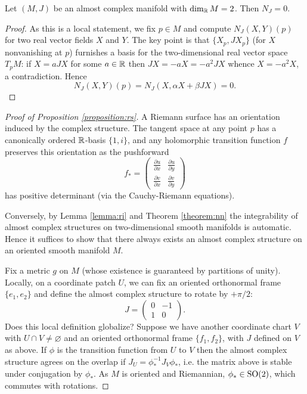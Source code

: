 \documentclass{amsart}
\begin{document}
\begin{lemma}
    Let $(M,J)$ be an almost complex manifold with $\dim_{\mathbb{R}} M=2$. Then $N_J=0$.
    \label{lemma:ri}
\end{lemma}
\begin{proof}
    As this is a local statement, we fix $p\in M$ and compute $N_J(X,Y)(p)$ for two real vector fields
    $X$ and $Y$. The key point is that $\{X_p, JX_p\}$ (for $X$ nonvanishing at $p$) furnishes a basis for
    the two-dimensional real vector space $T_pM$: if $X=aJX$ for some $a\in\mathbb{R}$ then $JX=-aX=-a^2JX$ whence
    $X=-a^2X$, a contradiction. Hence
    \begin{equation*}
        N_J(X,Y)(p) = N_J(X, \alpha X+\beta JX) = 0.
    \end{equation*}
\end{proof}

\begin{proof}[Proof of Proposition \ref{proposition:rs}]
    A Riemann surface has an orientation induced by the complex structure. The
    tangent space at any point $p$ has a canonically ordered $\mathbb{R}$-basis $\{1,i\}$, and any holomorphic transition
    function $f$ preserves this orientation as the pushforward
    \begin{equation*}
        f_* =
        \begin{pmatrix}
            \frac{\partial u}{\partial x} & \frac{\partial u}{\partial y}\\
            \frac{\partial v}{\partial x} & \frac{\partial v}{\partial y}
        \end{pmatrix}
    \end{equation*}
    has positive determinant (via the Cauchy-Riemann equations).


    Conversely, by Lemma \ref{lemma:ri} and Theorem \ref{theorem:nn} the integrability of almost complex structures on
    two-dimensional smooth manifolds is automatic. Hence it suffices to show that there always exists an almost
    complex structure on an oriented smooth manifold $M$.

    Fix a metric $g$ on $M$ (whose existence is guaranteed by partitions of unity). Locally, on a coordinate patch
    $U$, we can fix an oriented orthonormal frame $\{e_1,e_2\}$ and define the almost complex structure to rotate
    by $+\pi/2$:
    \begin{equation*}
        J =
        \begin{pmatrix}
            0 & -1\\ 1 & 0
        \end{pmatrix}.
    \end{equation*}
    Does this local definition globalize? Suppose we have another coordinate chart $V$ with $U\cap V\neq\varnothing$
    and an oriented orthonormal frame $\{f_1,f_2\}$, with $J$ defined on $V$ as above. If $\phi$ is the transition function
    from $U$ to $V$ then the almost complex structure agrees on the overlap if $J_U=\phi_*^{-1}J_V\phi_*$, i.e.
    the matrix above is stable under conjugation by $\phi_*$. As $M$ is oriented and Riemannian, $\phi_*\in\operatorname{SO}(2)$,
    which commutes with rotations.
    
\end{proof}
\end{document}
